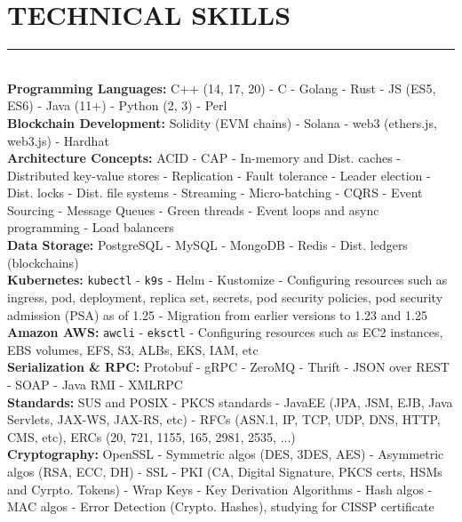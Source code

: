 \documentclass[10pt,a4paper]{article}
\begin{document}
\small
\section{TECHNICAL SKILLS}
\noindent \rule {18.0cm}{0.2pt} \\
\noindent
\textbullet \hspace{0.1cm}\textbf{Programming Languages:} C++ (14, 17, 20) - C - Golang - Rust - JS (ES5, ES6) - Java (11+) - Python (2, 3) - Perl \\
\textbullet \hspace{0.1cm}\textbf{Blockchain Development:} Solidity (EVM chains) - Solana - web3 (ethers.js, web3.js) - Hardhat \\
\textbullet \hspace{0.1cm}\textbf{Architecture Concepts:} ACID - CAP - In-memory and Dist. caches - Distributed key-value stores - Replication - Fault tolerance - Leader election - Dist. locks - Dist. file systems - Streaming - Micro-batching - CQRS - Event Sourcing - Message Queues - Green threads - Event loops and async programming - Load balancers \\
\textbullet \hspace{0.1cm}\textbf{Data Storage:} PostgreSQL - MySQL - MongoDB - Redis - Dist. ledgers (blockchains) \\
\textbullet \hspace{0.1cm}\textbf{Kubernetes:} \texttt{kubectl} - \texttt{k9s} - Helm - Kustomize - Configuring resources such as ingress, pod, deployment, replica set, secrets, pod security policies, pod security admission (PSA) as of 1.25 - Migration from earlier versions to 1.23 and 1.25  \\
\textbullet \hspace{0.1cm}\textbf{Amazon AWS:} \texttt{awcli} - \texttt{eksctl} - Configuring resources such as EC2 instances, EBS volumes, EFS, S3, ALBs, EKS, IAM, etc \\
\textbullet \hspace{0.1cm}\textbf{Serialization \& RPC:} Protobuf - gRPC - ZeroMQ - Thrift - JSON over REST - SOAP - Java RMI - XMLRPC \\
\textbullet \hspace{0.1cm}\textbf{Standards:} SUS and POSIX - PKCS standards - JavaEE (JPA, JSM, EJB, Java Servlets, JAX-WS, JAX-RS, etc) - RFCs (ASN.1, IP, TCP, UDP, DNS, HTTP, CMS, etc), ERCs (20, 721, 1155, 165, 2981, 2535, ...) \\
\textbullet \hspace{0.1cm}\textbf{Cryptography:} OpenSSL - Symmetric algos (DES, 3DES, AES) - Asymmetric algos (RSA, ECC, DH) - SSL - PKI (CA, Digital Signature, PKCS certs, HSMs and Cyrpto. Tokens) - Wrap Keys - Key Derivation Algorithms - Hash algos - MAC algos - Error Detection (Crypto. Hashes), studying for CISSP certificate  \\ 
\end{document}
